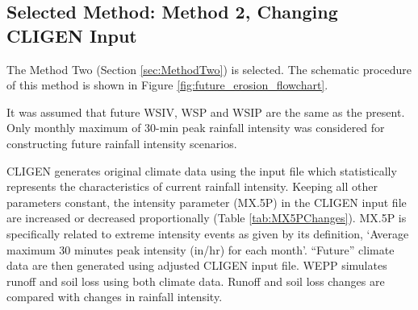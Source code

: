 
\subsection{Selected Method: Method 2, Changing CLIGEN Input}
\label{sec:SelectedMethod}

The Method Two (Section \ref{sec:MethodTwo}) is selected. The schematic
procedure of this method is shown in Figure \ref{fig:future_erosion_flowchart}.

It was assumed that future WSIV, WSP and WSIP are the same as the present. Only
monthly maximum of 30-min peak rainfall intensity was considered for
constructing future rainfall intensity scenarios.

CLIGEN generates original climate data using the input file which statistically
represents the characteristics of current rainfall intensity. Keeping all other
parameters constant, the intensity parameter ({MX.5P}) in the CLIGEN input file
are increased or decreased proportionally (Table \ref{tab:MX5PChanges}).
{MX.5P} is specifically related to extreme intensity events as given by its
definition, `Average maximum 30 minutes peak intensity (in/hr) for each month'.
``Future'' climate data are then generated using adjusted CLIGEN input file.
WEPP simulates runoff and soil loss using both climate data. Runoff and soil
loss changes are compared with changes in rainfall intensity.


